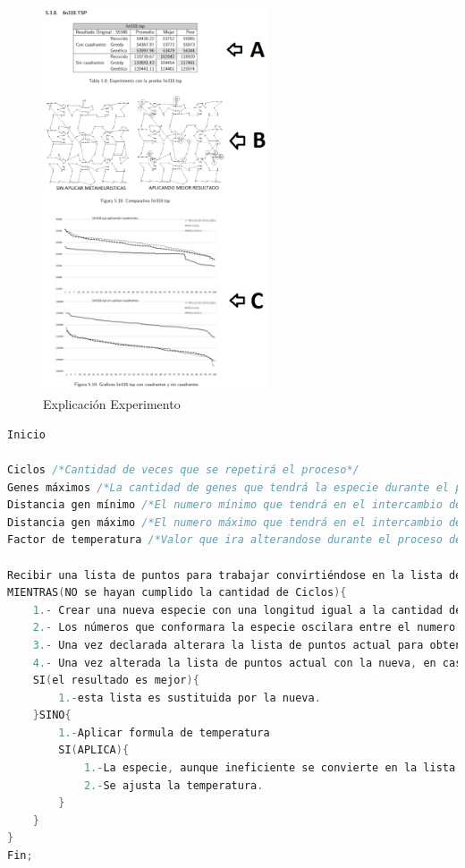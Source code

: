 \begin{figure}[hbtp]
    \centering
        \includegraphics[width=0.6\textwidth]{PruebasResultados/Imagenes/ExplicacionExperimento.png}
        \caption{Explicación Experimento}
        \label{fig:ExplicacionExperimento.png}
\end{figure}
\clearpage \newpage

\begin{lstlisting}[language=C++, caption=Algoritmo Recocido Simulado aplicado en las pruebas, label=lst:AlgoritmoRecocidoSimuladoPruebas]
Inicio

Ciclos /*Cantidad de veces que se repetirá el proceso*/
Genes máximos /*La cantidad de genes que tendrá la especie durante el proceso de búsqueda local*/
Distancia gen mínimo /*El numero mínimo que tendrá en el intercambio de posiciones*/
Distancia gen máximo /*El numero máximo que tendrá en el intercambio de posiciones*/
Factor de temperatura /*Valor que ira alterandose durante el proceso de recocido simulado (este valor es multiplicado internamente por 1x10n12)*/

Recibir una lista de puntos para trabajar convirtiéndose en la lista de puntos actual.
MIENTRAS(NO se hayan cumplido la cantidad de Ciclos){
	1.- Crear una nueva especie con una longitud igual a la cantidad de genes máximos.
	2.- Los números que conformara la especie oscilara entre el numero mínimo y máximo declarados anteriormente.
	3.- Una vez declarada alterara la lista de puntos actual para obtener una lista nueva.
	4.- Una vez alterada la lista de puntos actual con la nueva, en caso de obtener un mejor resultado 
	SI(el resultado es mejor){
		1.-esta lista es sustituida por la nueva.
	}SINO{
		1.-Aplicar formula de temperatura
		SI(APLICA){
		    1.-La especie, aunque ineficiente se convierte en la lista de puntos actual.
		    2.-Se ajusta la temperatura.
		}
	}
}
Fin;
\end{lstlisting}

